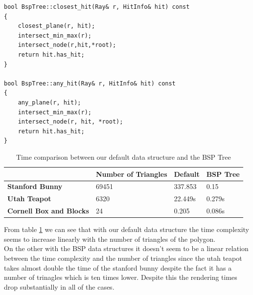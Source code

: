 \begin{lstlisting}
bool BspTree::closest_hit(Ray& r, HitInfo& hit) const
{
	closest_plane(r, hit);
	intersect_min_max(r);
	intersect_node(r,hit,*root);
	return hit.has_hit;
}

bool BspTree::any_hit(Ray& r, HitInfo& hit) const
{
	any_plane(r, hit);
	intersect_min_max(r);
	intersect_node(r, hit, *root);
	return hit.has_hit;
}
\end{lstlisting}

\begin{table}[H]
	\centering
	\begin{tabular}{|l|l|l|l|}
		\hline
		\textbf{}                       & \textbf{Number of Triangles} & \textbf{Default} & \textbf{BSP Tree} \\ \hline
		\textbf{Stanford Bunny}         & 69451                        & 337.853          & 0.15              \\ \hline
		\textbf{Utah Teapot}            & 6320                         & 22.449s          & 0.279s            \\ \hline
		\textbf{Cornell Box and Blocks} & 24                           & 0.205            & 0.086s            \\ \hline
	\end{tabular}
	\caption{Time comparison between our default data structure and the BSP Tree}
	\label{table:time_comparisons}
\end{table}
From table \ref{table:time_comparisons} we can see that with our default data structure the time complexity seems to increase linearly with the number of triangles of the polygon.\\
On the other with the BSP data structures it doesn't seem to be a linear relation between the time complexity and the number of triangles since the utah teapot takes almost double the time of the stanford bunny despite the fact it has a number of trinagles which is ten times lower.
Despite this the rendering times drop substantially in all of the cases.